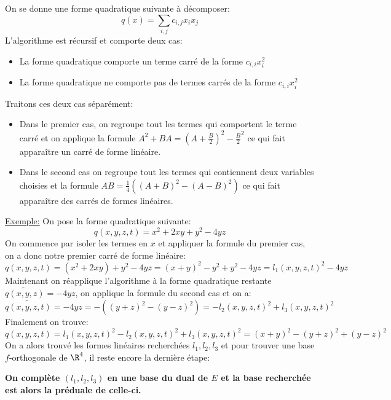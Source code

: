 \subsection*{}
On se donne une forme quadratique suivante à décomposer:
\[
   q(x) = \sum_{i, j}c_{i, j}x_ix_j
\]
L'algorithme est récursif et comporte deux cas:
\begin{itemize}
   \item La forme quadratique comporte un terme carré de la forme \(c_{i,i}x_i^2\)
   \item La forme quadratique ne comporte pas de termes carrés de la forme \(c_{i,i}x_i^2\)
\end{itemize}
\pagebreak

Traitons ces deux cas séparément:
\begin{itemize}
   \item Dans le premier cas, on regroupe tout les termes qui comportent le terme carré et on applique la formule \(A^2 + BA = (A + \frac{B}{2})^2 - \frac{B}{2}^2\) ce qui fait apparaître un carré de forme linéaire.
   \item Dans le second cas on regroupe tout les termes qui contiennent deux variables choisies et la formule \(AB = \frac{1}{4}((A + B)^2 - (A - B)^2)\) ce qui fait apparaître des carrés de formes linéaires.
\end{itemize}
\uline{Exemple:} On pose la forme quadratique suivante:
\[
   q(x, y, z, t) = x^2 + 2xy + y^2 - 4yz
\]
On commence par isoler les termes en \(x\) et appliquer la formule du premier cas, on a donc notre premier carré de forme linéaire:
\[
   q(x, y, z, t) = (x^2 + 2xy) +y^2 - 4yz = (x + y)^2 -y^2 + y^2 - 4yz = l_1(x, y, z, t)^2 - 4yz
\]
Maintenant on réapplique l'algorithme à la forme quadratique restante \(\tilde{q(x, y, z)} = -4yz\), on applique la formule du second cas et on a:
\[
   \tilde{q(x, y, z, t)} = -4yz = -((y + z)^2 - (y - z)^2) = -l_2(x, y, z, t)^2 + l_3(x, y, z, t)^2
\]
Finalement on trouve:
\[
   q(x, y, z, t) = l_1(x, y, z, t)^2 - l_2(x, y, z, t)^2 + l_3(x, y, z, t)^2 = (x + y)^2 - (y + z)^2 + (y - z)^2
\]
On a alors trouvé les formes linéaires recherchées \(l_1, l_2, l_3\) et pour trouver une base \(f\)-orthogonale de \(\R^4\), il reste encore la dernière étape:
\begin{center}
   \textbf{On complète \((l_1, l_2, l_3)\) en une base du dual de \(E\) et la base recherchée est alors la préduale de celle-ci.}
\end{center}
